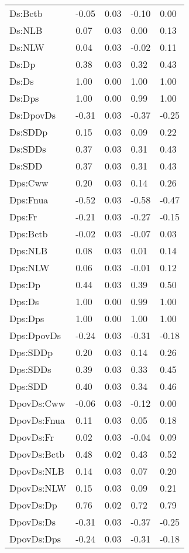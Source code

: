 \begin{center}
\begin{longtable}{|p{0.9in}|p{0.7in}|p{0.7in}|p{0.7in}|p{0.7in}|}
  Ds:Bctb & -0.05 & 0.03 & -0.10 & 0.00 \\ 
  Ds:NLB & 0.07 & 0.03 & 0.00 & 0.13 \\ 
  Ds:NLW & 0.04 & 0.03 & -0.02 & 0.11 \\ 
  Ds:Dp & 0.38 & 0.03 & 0.32 & 0.43 \\ 
  Ds:Ds & 1.00 & 0.00 & 1.00 & 1.00 \\ 
  Ds:Dps & 1.00 & 0.00 & 0.99 & 1.00 \\ 
  Ds:DpovDs & -0.31 & 0.03 & -0.37 & -0.25 \\ 
  Ds:SDDp & 0.15 & 0.03 & 0.09 & 0.22 \\ 
  Ds:SDDs & 0.37 & 0.03 & 0.31 & 0.43 \\ 
  Ds:SDD & 0.37 & 0.03 & 0.31 & 0.43 \\ 
  Dps:Cww & 0.20 & 0.03 & 0.14 & 0.26 \\ 
  Dps:Fnua & -0.52 & 0.03 & -0.58 & -0.47 \\ 
  Dps:Fr & -0.21 & 0.03 & -0.27 & -0.15 \\ 
  Dps:Bctb & -0.02 & 0.03 & -0.07 & 0.03 \\ 
  Dps:NLB & 0.08 & 0.03 & 0.01 & 0.14 \\ 
  Dps:NLW & 0.06 & 0.03 & -0.01 & 0.12 \\ 
  Dps:Dp & 0.44 & 0.03 & 0.39 & 0.50 \\ 
  Dps:Ds & 1.00 & 0.00 & 0.99 & 1.00 \\ 
  Dps:Dps & 1.00 & 0.00 & 1.00 & 1.00 \\ 
  Dps:DpovDs & -0.24 & 0.03 & -0.31 & -0.18 \\ 
  Dps:SDDp & 0.20 & 0.03 & 0.14 & 0.26 \\ 
  Dps:SDDs & 0.39 & 0.03 & 0.33 & 0.45 \\ 
  Dps:SDD & 0.40 & 0.03 & 0.34 & 0.46 \\ 
  DpovDs:Cww & -0.06 & 0.03 & -0.12 & 0.00 \\ 
  DpovDs:Fnua & 0.11 & 0.03 & 0.05 & 0.18 \\ 
  DpovDs:Fr & 0.02 & 0.03 & -0.04 & 0.09 \\ 
  DpovDs:Bctb & 0.48 & 0.02 & 0.43 & 0.52 \\ 
  DpovDs:NLB & 0.14 & 0.03 & 0.07 & 0.20 \\ 
  DpovDs:NLW & 0.15 & 0.03 & 0.09 & 0.21 \\ 
  DpovDs:Dp & 0.76 & 0.02 & 0.72 & 0.79 \\ 
  DpovDs:Ds & -0.31 & 0.03 & -0.37 & -0.25 \\ 
  DpovDs:Dps & -0.24 & 0.03 & -0.31 & -0.18 \\ 

\end{longtable}
\end{center}
